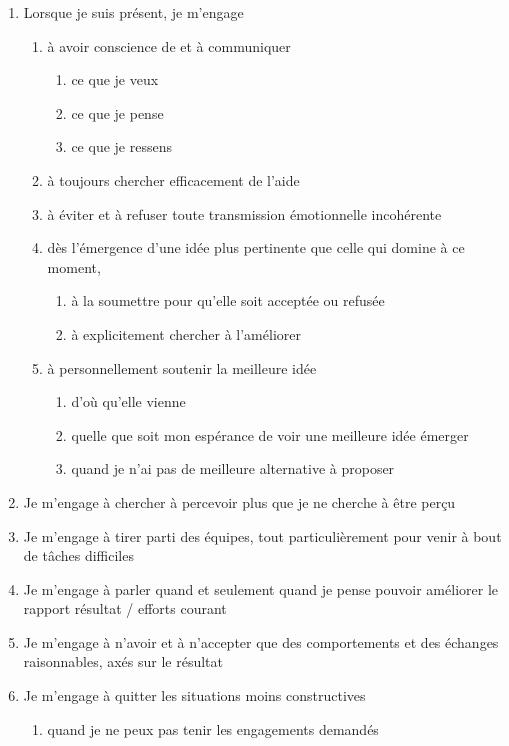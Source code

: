 \documentclass[paper=6in:9in,pagesize=pdftex,headinclude=on,footinclude=on,12pt]{scrbook}
\begin{document}
\begin{enumerate}
	\item Lorsque je suis présent, je m'engage
	\begin{enumerate}
		\item à avoir conscience de et à communiquer
		\begin{enumerate}
			\item ce que je veux
			\item ce que je pense
			\item ce que je ressens
		\end{enumerate}
		\item à toujours chercher efficacement de l'aide
		\item à éviter et à refuser toute transmission émotionnelle incohérente
		\item dès l'émergence d'une idée plus pertinente que celle qui domine
		      à ce moment,
		\begin{enumerate}
			\item à la soumettre pour qu'elle soit acceptée ou refusée
			\item à explicitement chercher à l'améliorer
		\end{enumerate}
		\item à personnellement soutenir la meilleure idée
		\begin{enumerate}
			\item d'où qu'elle vienne
			\item quelle que soit mon espérance de voir une meil\-leure idée émerger
			\item quand je n'ai pas de meilleure alternative à proposer
		\end{enumerate}
	\end{enumerate}
	\item Je m'engage à chercher à percevoir plus que je ne cherche à être perçu
	\item Je m'engage à tirer parti des équipes, tout particulièrement pour venir à bout de tâches difficiles
	\item Je m'engage à parler quand et seulement quand je pense pouvoir améliorer le rapport \og{}résultat / efforts\fg{} courant
	\item Je m'engage à n'avoir et à n'accepter que des comportements et des échanges raisonnables, axés sur le résultat
	\item Je m'engage à quitter les situations moins constructives
	\begin{enumerate}
		\item quand je ne peux pas tenir les engagements demandés

\end{enumerate}
\end{enumerate}
\end{document}
